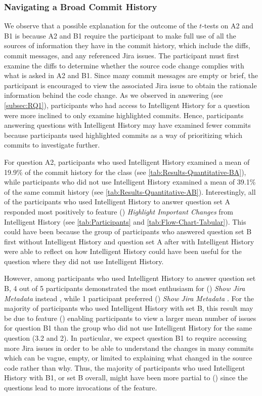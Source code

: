 \subsubsection{Navigating a Broad Commit History}

We observe that a possible explanation for the outcome of the $t$-tests on A2 and B1 is
because A2 and B1 require the participant to make full use of all the sources of
information they have in the commit history, which include the diffs, commit messages,
and any referenced Jira issues.
The participant must first examine the diffs to determine whether the source code change
complies with what is asked in A2 and B1.
Since many commit messages are empty or brief, the participant is encouraged to view
the associated Jira issue to obtain the rationale information behind the code change.
As we observed in answering  (see \autoref{subsec:RQ1}), 
participants who had access to Intelligent History for a question
were more inclined to only examine highlighted commits.
Hence, participants answering questions with Intelligent History may have examined fewer commits
because participants used highlighted commits as a way of prioritizing which commits to investigate further.

For question A2, participants who used Intelligent History examined a mean of 19.9\% of the commit history for the  class (see \autoref{tab:Results-Quantitative-BA}),
while participants who did not use Intelligent History examined a mean of 39.1\% of the same commit history (see \autoref{tab:Results-Quantitative-AB}). 
Interestingly, all of the participants who used Intelligent History to answer question set A 
responded most positively to feature () \textit{Highlight Important Changes} from Intelligent History  
(see \autoref{tab:Participants} and \autoref{tab:Flow-Chart-Tabular}).
This could have been because the group of participants who answered question set B first without Intelligent History 
and question set A after with Intelligent History were able to reflect on how Intelligent History 
could have been useful for the question where they did not use Intelligent History.

However, among participants who used Intelligent History to answer question set B,
4 out of 5 participants demonstrated the most enthusiasm for () \textit{Show Jira Metadata} instead ,
while 1 participant preferred () \textit{Show Jira Metadata} .
For the majority of participants who used Intelligent History with set B, this result may be due
to feature () enabling participants to view a larger mean number of issues for question B1 than the 
group who did not use Intelligent History for the same question (3.2 and 2).
In particular, we expect question B1 to require accessing more Jira issues in order to be able
to understand the changes in many commits which can be vague, empty, or limited to explaining
what changed in the source code rather than why.
Thus, the majority of participants who used Intelligent History
with B1, or set B overall, might have been more partial to () since the questions
lead to more invocations of the feature.

